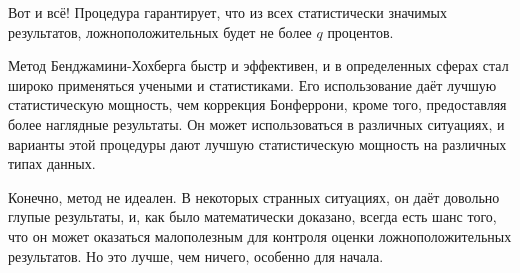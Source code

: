 Вот и всё! Процедура гарантирует, что из всех статистически значимых результатов, ложноположительных будет не более $q$ процентов. \cite{benjamini_controlling_1995}


Метод Бенджамини-Хохберга быстр и эффективен, и в определенных сферах стал широко применяться учеными и статистиками. Его использование даёт лучшую статистическую мощность, чем коррекция Бонферрони, кроме того, предоставляя более наглядные результаты. Он может использоваться в различных ситуациях, и варианты этой процедуры дают лучшую статистическую мощность на различных типах данных.

Конечно, метод не идеален. В некоторых странных ситуациях, он даёт довольно глупые результаты, и, как было математически доказано, всегда есть шанс того, что он может оказаться малополезным для контроля оценки ложноположительных результатов. Но это лучше, чем ничего, особенно для начала.
